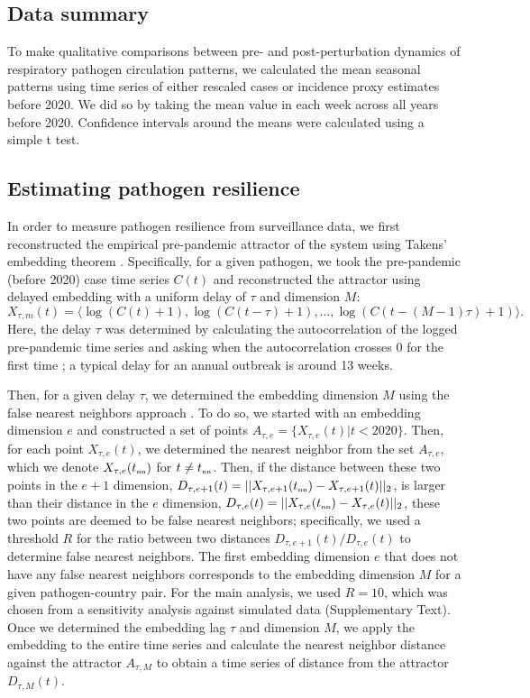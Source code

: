\documentclass[12pt]{article}
\newcommand{\tsub}[2]{#1_{{\textrm{\tiny #2}}}}
\begin{document}
\subsection*{Data summary}

To make qualitative comparisons between pre- and post-perturbation dynamics of respiratory pathogen circulation patterns, we calculated the mean seasonal patterns using time series of either rescaled cases or incidence proxy estimates before 2020.
We did so by taking the mean value in each week across all years before 2020.
Confidence intervals around the means were calculated using a simple t test.

\subsection*{Estimating pathogen resilience}

In order to measure pathogen resilience from surveillance data, we first reconstructed the empirical pre-pandemic attractor of the system using Takens' embedding theorem \citep{takens2006detecting}.
Specifically, for a given pathogen, we took the pre-pandemic (before 2020) case time series $C(t)$ and reconstructed the attractor using delayed embedding with a uniform delay of $\tau$ and dimension $M$:
\begin{equation}
X_{\tau,m}(t) = \langle\log(C(t)+1), \log(C(t-\tau)+1), \dots, \log(C(t-(M-1)\tau)+1)\rangle.
\end{equation}
Here, the delay $\tau$ was determined by calculating the autocorrelation of the logged pre-pandemic time series and asking when the autocorrelation crosses 0 for the first time \citep{tan2023selecting};
a typical delay for an annual outbreak is around 13 weeks.

Then, for a given delay $\tau$, we determined the embedding dimension $M$ using the false nearest neighbors approach \citep{kennel1992determining,tan2023selecting}.
To do so, we started with an embedding dimension $e$ and constructed a set of points $A_{\tau,e}= \{X_{\tau,e}(t) | t < 2020\}$.
Then, for each point $X_{\tau,e}(t)$, we determined the nearest neighbor from the set $A_{\tau,e}$, which we denote $X_{\tau,e}(\tsub{t}{nn})$ for $t \neq \tsub{t}{nn}$.
Then, if the distance between these two points in the $e+1$ dimension, $D_{\tau,e+1}(t) = ||X_{\tau,e+1}(\tsub{t}{nn})-X_{\tau,e+1}(t)||_2$, is larger than their distance in the $e$ dimension, $D_{\tau,e}(t) = ||X_{\tau,e}(\tsub{t}{nn})-X_{\tau,e}(t)||_2$, these two points are deemed to be false nearest neighbors;
specifically, we used a threshold $R$ for the ratio between two distances $D_{\tau,e+1}(t)/D_{\tau,e}(t)$ to determine false nearest neighbors.
The first embedding dimension $e$ that does not have any false nearest neighbors corresponds to the embedding dimension $M$ for a given pathogen-country pair.
For the main analysis, we used $R=10$, which was chosen from a sensitivity analysis against simulated data (Supplementary Text).
Once we determined the embedding lag $\tau$ and dimension $M$, we apply the embedding to the entire time series and calculate the nearest neighbor distance against the attractor $A_{\tau,M}$ to obtain a time series of distance from the attractor $D_{\tau,M}(t)$.
\end{document}
